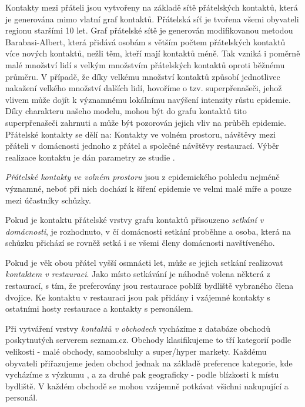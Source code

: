 Kontakty mezi přáteli jsou vytvořeny na základě sítě přátelských kontaktů, která je generována mimo vlatní graf kontaktů. Přátelská síť je tvořena všemi obyvateli regionu staršími 10 let. Graf přátelské sítě je generován modifikovanou metodou Barabasi-Albert, která přidává osobám s větším počtem přátelských kontaktů více nových kontaktů, nežli těm, kteří mají kontaktů méně. Tak vzniká i poměrně malé množství lidí s velkým množstvím přátelských kontaktů oproti běžnému průměru. V případě, že díky velkému množství kontaktů způsobí jednotlivec nakažení velkého množství dalších lidí, hovoříme o tzv. superpřenašeči, jehož vlivem může dojít k významnému lokálnímu navýšení intenzity růstu epidemie. Díky charakteru našeho modelu, mohou být do grafu kontaktů tito superpřenašeči zahrnuti a může být pozorován jejich vliv na průběh epidemie.
Přátelské kontakty se dělí na: Kontakty ve volném prostoru, návštěvy mezi přáteli v domácnosti jednoho z přátel a společné návštěvy restaurací. Výběr realizace kontaktu je dán parametry ze studie \cite{zaj:medianlife}.

\emph{Přátelské kontakty ve volném prostoru} jsou z epidemického pohledu nejméně významné, neboť při nich dochází k šíření epidemie ve velmi malé míře a pouze mezi účastníky schůzky.

Pokud je kontaktu přátelské vrstvy grafu kontaktů přisouzeno \emph{setkání v domácnosti}, je rozhodnuto, v čí domácnosti setkání proběhne a osoba, která na schůzku přichází se rovněž setká i se všemi členy domácnosti navštíveného.

Pokud je věk obou přátel vyšší osmnácti let, může se jejich setkání realizovat \emph{kontaktem v restauraci}. Jako místo setkávání je náhodně volena některá z restaurací, s tím, že preferovány jsou restaurace poblíž bydliště vybraného člena dvojice. Ke kontaktu v restauraci jsou pak přidány i vzájemné kontakty s ostatními hosty restaurace a kontakty s personálem.


Při vytváření vrstvy \emph{kontaktů v obchodech} vycházíme z databáze obchodů poskytnutých serverem seznam.cz. Obchody klasifikujeme to tří kategorií podle velikosti - malé obchody, samoobsluhy a super/hyper markety. Každému obyvateli přiřazujeme jeden obchod jednak na základě preference kategorie, kde vycházíme z výzkumu \cite{zaj:medianlife}, a za druhé pak geograficky - podle blízkosti k místu bydliště. V každém obchodě se mohou vzájemně potkávat všichni nakupující a personál.

